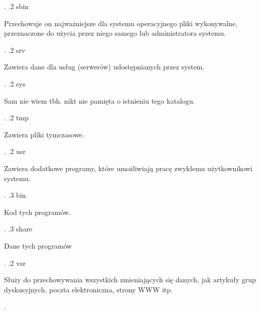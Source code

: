 \documentclass[12pt]{article}
\begin{document}
{\begin{minipage}[t]{0.5\textwidth}
            \vspace{\baselineskip}
        \end{minipage}.
        .2 sbin \dotfill \begin{minipage}[t]{0.5\textwidth}
            \textnormal{Przechowuje on najważniejsze dla systemu operacyjnego pliki wykonywalne, przeznaczone do użycia przez niego samego lub administratora systemu.}
            \vspace{\baselineskip}
        \end{minipage}.
        .2 srv \dotfill \begin{minipage}[t]{0.5\textwidth}
            \textnormal{Zawiera dane dla usług (serwerów) udostępnianych przez system.}
            \vspace{\baselineskip}
        \end{minipage}.
        .2 sys \dotfill \begin{minipage}[t]{0.5\textwidth}
            \textnormal{Sam nie wiem tbh. nikt nie pamięta o istnieniu tego katalogu.}
            \vspace{\baselineskip}
        \end{minipage}.
        .2 tmp \dotfill \begin{minipage}[t]{0.5\textwidth}
            \textnormal{Zawiera pliki tymczasowe.}
            \vspace{\baselineskip}
        \end{minipage}.
        .2 usr \dotfill \begin{minipage}[t]{0.5\textwidth}
            \textnormal{Zawiera dodatkowe programy, które umożliwiają pracę zwykłemu użytkownikowi systemu.}
            \vspace{\baselineskip}
        \end{minipage}.
            .3 bin \dotfill \begin{minipage}[t]{0.5\textwidth}
                \textnormal{Kod tych programów.}
                \vspace{\baselineskip}
            \end{minipage}.
            .3 share \dotfill \begin{minipage}[t]{0.5\textwidth}
                \textnormal{Dane tych programów}
                \vspace{\baselineskip}
            \end{minipage}.
        .2 var \dotfill \begin{minipage}[t]{0.5\textwidth}
            \textnormal{Służy do przechowywania wszystkich zmieniających się danych, jak artykuły grup dyskusyjnych, poczta elektroniczna, strony WWW itp.}
            \vspace{\baselineskip}
        \end{minipage}.
}\hfill
\end{document}
